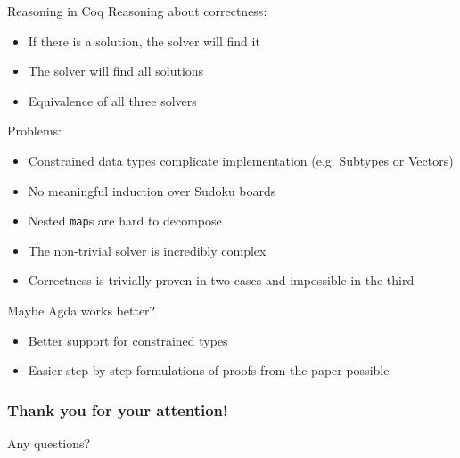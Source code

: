 \documentclass{beamer}
\begin{document}
\begin{frame}{Reasoning in Coq}
  Reasoning about correctness:
  \begin{itemize}
    \item If there is a solution, the solver will find it
    \item The solver will find all solutions
    \item Equivalence of all three solvers
  \end{itemize}
  
  Problems:
  \begin{itemize}
    \item Constrained data types complicate implementation (e.g. Subtypes or Vectors)
    \item No meaningful induction over Sudoku boards
    \item Nested \texttt{map}s are hard to decompose
    \item The non-trivial solver is incredibly complex
    \item Correctness is trivially proven in two cases and impossible in the third
  \end{itemize}
\end{frame}

\begin{frame}{Maybe Agda works better?}
  \begin{itemize}
    \item Better support for constrained types
    \item Easier step-by-step formulations of proofs from the paper possible
  \end{itemize}
\end{frame}

\begin{frame}
  \frametitle{Thank you for your attention!}
  
  Any questions?
\end{frame}


\end{document}

